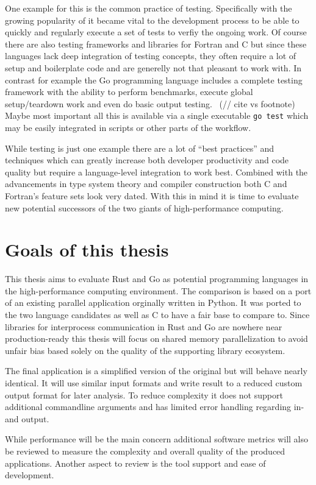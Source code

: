 One example for this is the common practice of testing. Specifically with the growing popularity of  it became vital to the development process to be able to quickly and regularly execute a set of tests to verfiy the ongoing work. Of course there are also testing frameworks and libraries for Fortran and C but since these languages lack deep integration of testing concepts, they often require a lot of setup and boilerplate code and are generelly not that pleasant to work with. In contrast for example the Go programming language includes a complete testing framework with the ability to perform benchmarks, execute global setup/teardown work and even do basic output testing.~\cite{go_doc_testing} (// cite vs footnote) Maybe most important all this is available via a single executable \lstinline$go test$ which may be easily integrated in scripts or other parts of the workflow.

While testing is just one example there are a lot of ``best practices'' and techniques which can greatly increase both developer productivity and code quality but require a language-level integration to work best. Combined with the advancements in type system theory and compiler construction both C and Fortran's feature sets look very dated. With this in mind it is time to evaluate new potential successors of the two giants of high-performance computing.

\section{Goals of this thesis}
\label{sec:Introduction::Goals}

This thesis aims to evaluate Rust and Go as potential programming languages in the high-performance computing environment. The comparison is based on a port of an existing parallel application orginally written in Python. It was ported to the two language candidates as well as C to have a fair base to compare to. Since libraries for interprocess communication in Rust and Go are nowhere near production-ready this thesis will focus on shared memory parallelization to avoid unfair bias based solely on the quality of the supporting library ecosystem.

The final application is a simplified version of the original but will behave nearly identical. It will use similar input formats and write result to a reduced custom output format for later analysis. To reduce complexity it does not support additional commandline arguments and has limited error handling regarding in- and output.

While performance will be the main concern additional software metrics will also be reviewed to measure the complexity and overall quality of the produced applications. Another aspect to review is the tool support and ease of development.

